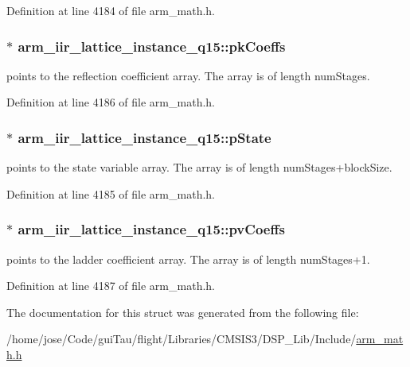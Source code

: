 Definition at line 4184 of file arm\-\_\-math.\-h.

\hypertarget{structarm__iir__lattice__instance__q15_a41c214a1ec38d4a82fae8899d715dd29}{
\subsubsection[{pk\-Coeffs}]{$\ast$ arm\-\_\-iir\-\_\-lattice\-\_\-instance\-\_\-q15\-::pk\-Coeffs}}\label{structarm__iir__lattice__instance__q15_a41c214a1ec38d4a82fae8899d715dd29}
points to the reflection coefficient array. The array is of length num\-Stages. 

Definition at line 4186 of file arm\-\_\-math.\-h.

\hypertarget{structarm__iir__lattice__instance__q15_afd0136ab917b529554d93f41a5e04618}{
\subsubsection[{p\-State}]{$\ast$ arm\-\_\-iir\-\_\-lattice\-\_\-instance\-\_\-q15\-::p\-State}}\label{structarm__iir__lattice__instance__q15_afd0136ab917b529554d93f41a5e04618}
points to the state variable array. The array is of length num\-Stages+block\-Size. 

Definition at line 4185 of file arm\-\_\-math.\-h.

\hypertarget{structarm__iir__lattice__instance__q15_a4c4f57f45b223abbe2a9fb727bd2cad9}{
\subsubsection[{pv\-Coeffs}]{$\ast$ arm\-\_\-iir\-\_\-lattice\-\_\-instance\-\_\-q15\-::pv\-Coeffs}}\label{structarm__iir__lattice__instance__q15_a4c4f57f45b223abbe2a9fb727bd2cad9}
points to the ladder coefficient array. The array is of length num\-Stages+1. 

Definition at line 4187 of file arm\-\_\-math.\-h.



The documentation for this struct was generated from the following file\-:\begin{DoxyCompactItemize}
\item 
/home/jose/\-Code/gui\-Tau/flight/\-Libraries/\-C\-M\-S\-I\-S3/\-D\-S\-P\-\_\-\-Lib/\-Include/\hyperlink{arm__math_8h}{arm\-\_\-math.\-h}\end{DoxyCompactItemize}

